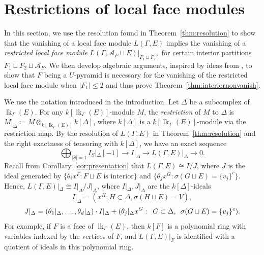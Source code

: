 \documentclass[ALCO, Unicode,published]{cedram}
\DeclareMathOperator{\lk}{lk}
\begin{document}
\section{Restrictions of local face modules}
In this section, we use the resolution found in Theorem~\ref{thm:resolution} to show that the vanishing of a local face module $L(\Gamma, E)$ implies the vanishing of a \emph{restricted local face module} $L(\Gamma, \mathcal{A}_F \sqcup E)|_{F_1 \sqcup F_2},$ for certain interior partitions $F_1 \sqcup F_2  \sqcup  \mathcal{A}_F$.  We then develop algebraic arguments, inspired by ideas from \cite{dMGPSS20}, to show that $F$ being a $U$-pyramid is necessary for the vanishing of the restricted local face module when $\vert F_1 \vert \le 2$ and thus prove Theorem~\ref{thm:interiornonvanish}. 

We use the notation introduced in the introduction. Let $\Delta$ be a subcomplex of $\lk_{\Gamma}(E)$. For any $k[\lk_{\Gamma}(E)]$-module $M$, the \emph{restriction} of $M$ to $\Delta$ is $M|_{\Delta}  \coloneqq  M \otimes_{k[\lk_{\Gamma}(E)]} k[\Delta]$, where $k[\Delta]$ is a $k[\lk_{\Gamma}(E)]$-module via the restriction map. By the resolution of $L(\Gamma,E)$ in  Theorem~\ref{thm:resolution} and the right exactness of tensoring with $k[\Delta]$, we have an exact sequence 
\begin{equation}\label{e:restrict}
 \bigoplus_{|S| = 1} I_{S}|_\Delta[-1] \to I|_\Delta \to L(\Gamma,E)|_\Delta \to 0.
\end{equation}
Recall from Corollary~\ref{cor:presentation} that $L(\Gamma, E) \cong I/J$, where $J$ is the ideal generated by $\{\theta_i x^{F} : F \sqcup E \mbox{ is interior}\}$ and $\{\theta_{j} x^G : \sigma(G \sqcup E) = \{v_j\}^c \}$.  Hence, $L(\Gamma,E)|_\Delta \cong I|_\Delta/J|_\Delta$, where $I|_\Delta,J|_\Delta$ are the $k[\Delta]$-ideals
\begin{equation}\label{eq:Ires}
I|_\Delta = (x^H :  H \subset \Delta, \sigma(H \sqcup E) = V),
\end{equation}
\begin{equation}\label{eq:Jres}
J|_\Delta = (\theta_1|_\Delta,\ldots,\theta_{d}|_\Delta) \cdot I|_\Delta + (\theta_{j}|_{\Delta} x^G: \enskip G \subset \Delta, \enskip \sigma(G \sqcup E) = \{v_j\}^c).    
\end{equation}
For example, if $F$ is a face of $\lk_{\Gamma}(E)$, then $k[F]$ is a polynomial ring with variables indexed by the vertices of $F$, and 
$L(\Gamma, E)|_{F}$ is identified with  a quotient of ideals in this polynomial ring.
\end{document}
